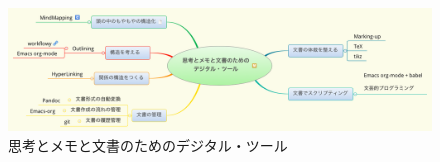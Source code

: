 \documentclass[dvipdfmx,11pat]{jarticle}
\begin{document}
\vspace{3cm}

\begin{figure}[htbp]
\centering
\includegraphics[width=18cm]{./map-images/05-digital_tools_for_thinking.png}
\caption{思考とメモと文書のためのデジタル・ツール}
\end{figure}
\end{document}
